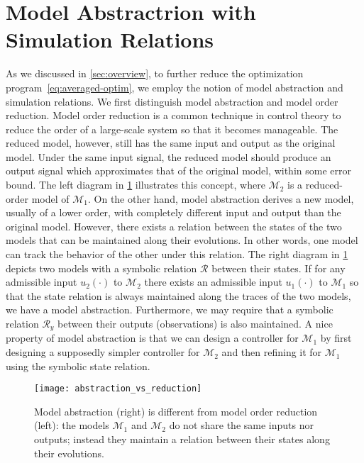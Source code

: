 \section{Model Abstractrion with Simulation Relations}
\label{sec:abstraction}

As we discussed in \cref{sec:overview}, to further reduce the optimization program~\eqref{eq:averaged-optim}, we employ the notion of model abstraction and simulation relations.
We first distinguish model abstraction and model order reduction.
Model order reduction is a common technique in control theory to reduce the order of a large-scale system so that it becomes manageable. The reduced model, however, still has
the same input and output as the original model. Under the same input signal,
the reduced model should produce an output signal which approximates that of
the original model, within some error bound. The left diagram in
\cref{fig:reduction-vs-abstraction} illustrates this concept, where
$\mathcal{M}_2$ is a reduced-order model of $\mathcal{M}_1$. On the other
hand, model abstraction derives a new model, usually of a lower order, with
completely different input and output than the original model. However, there
exists a relation between the states of the two models that can be maintained
along their evolutions. In other words, one model can track the behavior of
the other under this relation. The right diagram in
\cref{fig:reduction-vs-abstraction} depicts two models with a symbolic
relation $\mathcal{R}$ between their states. If for any admissible input $u_2
(\cdot)$ to $\mathcal{M}_2$ there exists an admissible input $u_1 (\cdot)$ to
$\mathcal{M}_1$ so that the state relation is always maintained along the
traces of the two models, we have a model abstraction. Furthermore, we may
require that a symbolic relation $\mathcal{R}_y$ between their outputs (observations) is also
maintained. A nice property of model abstraction is that we can design a
controller for $\mathcal{M}_1$ by first designing a supposedly simpler
controller for $\mathcal{M}_2$ and then refining it for $\mathcal{M}_1$ using
the symbolic state relation.

\begin{figure}[tb]
\texttt{[image: abstraction\_vs\_reduction]}
\caption{\label{fig:reduction-vs-abstraction}Model abstraction (right) is
  different from model order reduction (left): the models $\mathcal{M}_{1}$ and $\mathcal{M}_{2}$ do not share the same inputs nor outputs; instead they maintain a relation between their states along their evolutions.}
        \vspace{-10pt}
\end{figure}

